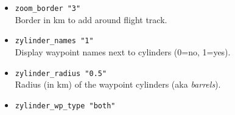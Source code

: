 \begin{itemize}
\item \texttt{zoom\_border    "3"}\\
    Border in km to add around flight track.

\item \texttt{zylinder\_names    "1"}\\
 Display waypoint names next to cylinders (0=no, 1=yes).
 
\item \texttt{zylinder\_radius    "0.5"}\\
 Radius (in km) of the waypoint cylinders (aka \emph{barrels}).

\item \texttt{zylinder\_wp\_type    "both"}

\end{itemize}
